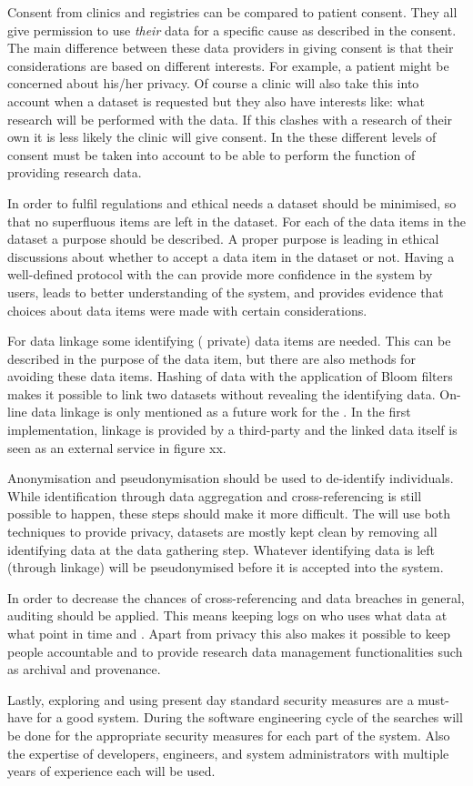 Consent from clinics and registries can be compared to patient consent.
They all give permission to use \emph{their} data for a specific cause as described in the consent.
The main difference between these data providers in giving consent is that their considerations are based on different interests.
For example, a patient might be concerned about his/her privacy.
Of course a clinic will also take this into account when a dataset is requested but they also have interests like: what research will be performed with the data.
If this clashes with a research of their own it is less likely the clinic will give consent.
In the \ivfsystem{} these different levels of consent must be taken into account  to be able to perform the function of providing research data.

In order to fulfil regulations and ethical needs a dataset should be minimised, so that no superfluous items are left in the dataset.
For each of the data items in the dataset a purpose should be described. 
A proper purpose is leading in ethical discussions about whether to accept a data item in the dataset or not.
Having a well-defined protocol with the \ivfsystem{} can provide more confidence in the system by users, leads to better understanding of the system, and provides evidence that choices about data items were made with certain considerations.

For data linkage some identifying (\ie{} private) data items are needed.
This can be described in the purpose of the data item, but there are also methods for avoiding these data items.
Hashing of data with the application of Bloom filters \cite{something} makes it possible to link two datasets without revealing the identifying data.
On-line data linkage is only mentioned as a future work for the \ivfsystem{}.
In the first implementation, linkage is provided by a third-party and the linked data itself is seen as an external service in figure xx.

Anonymisation and pseudonymisation should be used to de-identify individuals.
While identification through data aggregation and cross-referencing is still possible to happen, these steps should make it more difficult.
The \ivfsystem{} will use both techniques to provide privacy, datasets are mostly kept clean by removing all identifying data at the data gathering step.
Whatever identifying data is left (through linkage) will be pseudonymised before it is accepted into the system.

In order to decrease the chances of cross-referencing and data breaches in general, auditing should be applied.
This means keeping logs on who uses what data at what point in time and .
Apart from privacy this also makes it possible to keep people accountable and to provide research data management functionalities such as archival and provenance.

Lastly, exploring and using present day standard security measures are a must-have for a good system.
During the software engineering cycle of the \ivfsystem{} searches will be done for the appropriate security measures for each part of the system.
Also the expertise of developers, engineers, and system administrators with multiple years of experience each will be used.